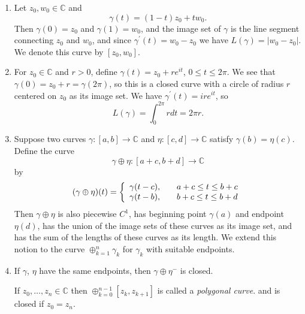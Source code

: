 \begin{xmpl}
  \begin{enumerate}
    \item{
      Let $z_0, w_0 \in \mathbb{C}$ and
      $$
      \gamma(t) = (1-t)z_0 + t w_0.
      $$
      Then $\gamma(0) = z_0$ and $\gamma(1) = w_0$,
      and the image set of $\gamma$ is the line segment
      connecting $z_0$ and $w_0$, and
      since $\gamma^\prime(t) = w_0 - z_0$ we have
      $L(\gamma) = |w_0 - z_0|$. We denote this curve by
      $[z_0, w_0]$.
    }
    \item{
      For $z_0 \in \mathbb{C}$ and $r > 0$, define
      $\gamma(t) = z_0 + r e^{it}$, $0 \leq t \leq 2\pi$.
      We see that $\gamma(0) = z_0 + r = \gamma(2\pi)$,
      so this is a closed curve with a circle of radius
      $r$ centered on $z_0$ as its image set.
      We have $\gamma^\prime(t) = i r e^{it}$, so
      $$
      L(\gamma) = \int_0^{2\pi} r dt = 2 \pi r.
      $$
    }
    \item{
      Suppose two curves $\gamma : [a, b] \to \mathbb{C}$
      and $\eta: [c, d] \to \mathbb{C}$ satisfy
      $\gamma(b) = \eta(c)$. Define the curve
      $$
      \gamma \oplus \eta : [a + c, b + d] \to \mathbb{C}
      $$
      by
      $$
        (\gamma \oplus \eta)(t)
      = \left\{\begin{array}{l l}
          \gamma(t - c), & \quad a + c \leq t \leq b + c \\
          \gamma(t - b), & \quad b + c \leq t \leq b + d
        \end{array}\right.
      $$
      Then $\gamma \oplus \eta$ is also piecewise $C^1$,
      has beginning point $\gamma(a)$ and endpoint $\eta(d)$,
      has the union of the image sets of these curves as its
      image set, and has the sum of the lengths of these curves
      as its length. We extend this notion to the curve
      $\oplus_{k=1}^n \gamma_k$ for $\gamma_k$ with suitable
      endpoints.
    }
    \item{
      If $\gamma$, $\eta$ have the same endpoints, then
      $\gamma \oplus \eta^{-}$ is closed.

      If $z_0, \dots, z_n \in \mathbb{C}$ then
      $\oplus_{k=0}^{n-1}[z_k, z_{k+1}]$ is called
      a \emph{polygonal curve}. and is closed if $z_0 = z_n$.
    }
  \end{enumerate}
\end{xmpl}


